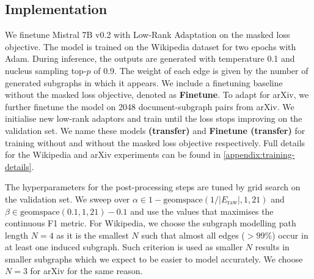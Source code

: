 \subsection{Implementation}

We finetune Mistral 7B v0.2 \cite{jiang2023mistral} with Low-Rank Adaptation \cite{hu2021lora} on the masked loss objective. The model is trained on the Wikipedia dataset for two epochs with Adam. During inference, the outputs are generated with temperature 0.1 and nucleus sampling \cite{holtzman2019curious} top-$p$ of 0.9. The weight of each edge is given by the number of generated subgraphs in which it appears. We include a finetuning baseline without the masked loss objective, denoted as \textbf{Finetune}. To adapt \name for arXiv, we further finetune the model on 2048 document-subgraph pairs from arXiv. We initialise new low-rank adaptors and train until the loss stops improving on the validation set. We name these models \textbf{\name (transfer)} and \textbf{Finetune (transfer)} for training without and without the masked loss objective respectively. Full details for the Wikipedia and arXiv experiments can be found in \cref{appendix:training-details}.

The hyperparameters for the post-processing steps are tuned by grid search on the validation set. We sweep over $\alpha \in 1 - \text{geomspace}(1 / |E_\text{raw}|, 1, 21)$ and $\beta \in \text{geomspace}(0.1, 1, 21) - 0.1$ and use the values that maximises the continuous F1 metric. For Wikipedia, we choose the subgraph modelling path length $N=4$ as it is the smallest $N$ such that almost all edges ($>99\%$) occur in at least one induced subgraph. Such criterion is used as smaller $N$ results in smaller subgraphs which we expect to be easier to model accurately. We choose $N=3$ for arXiv for the same reason.



